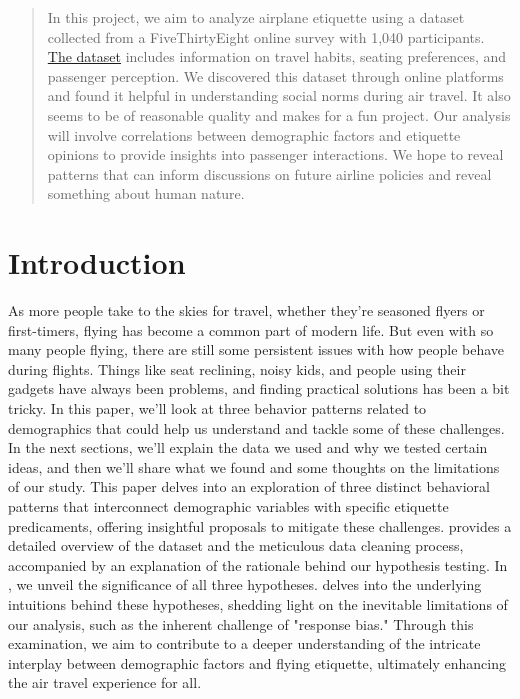 \documentclass{article}
\theoremstyle{plain}
\theoremstyle{definition}
\theoremstyle{remark}
\begin{document}
\printAffiliationsAndNotice{\icmlEqualContribution} %

\begin{abstract}
In this project, we aim to analyze airplane etiquette using a dataset collected from a FiveThirtyEight online survey with 1,040 participants. \href{https://github.com/fivethirtyeight/data/blob/master/flying-etiquette-survey/flying-etiquette.csv}{The dataset} includes information on travel habits, seating preferences, and passenger perception.
We discovered this dataset through online platforms and found it helpful in understanding social norms during air travel. It also seems to be of reasonable quality and makes for a fun project.
Our analysis will involve correlations between demographic factors and etiquette opinions to provide insights into passenger interactions. We hope to reveal patterns that can inform discussions on future airline policies and reveal something about human nature. 

\end{abstract}

\section{Introduction}\label{sec:intro}

As more people take to the skies for travel, whether they're seasoned flyers or first-timers, flying has become a common part of modern life. But even with so many people flying, there are still some persistent issues with how people behave during flights. Things like seat reclining, noisy kids, and people using their gadgets have always been problems, and finding practical solutions has been a bit tricky. In this paper, we'll look at three behavior patterns related to demographics that could help us understand and tackle some of these challenges. In the next sections, we'll explain the data we used and why we tested certain ideas, and then we'll share what we found and some thoughts on the limitations of our study. This paper delves into an exploration of three distinct behavioral patterns that interconnect demographic variables with specific etiquette predicaments, offering insightful proposals to mitigate these challenges.  provides a detailed overview of the dataset and the meticulous data cleaning process, accompanied by an explanation of the rationale behind our hypothesis testing. In , we unveil the significance of all three hypotheses.  delves into the underlying intuitions behind these hypotheses, shedding light on the inevitable limitations of our analysis, such as the inherent challenge of "response bias." Through this examination, we aim to contribute to a deeper understanding of the intricate interplay between demographic factors and flying etiquette, ultimately enhancing the air travel experience for all.
\end{document}
